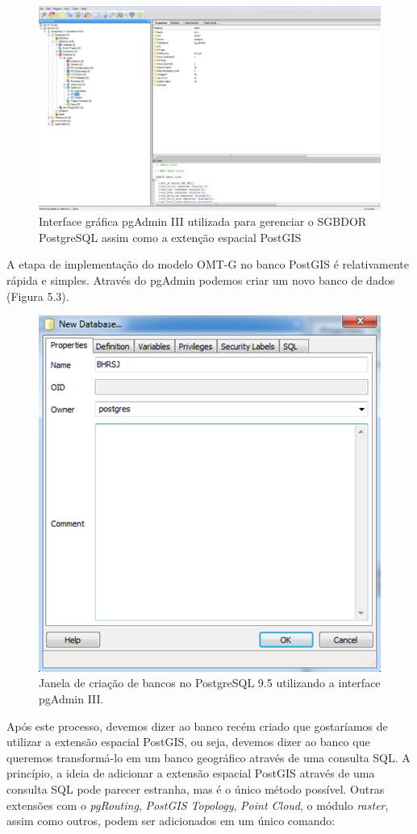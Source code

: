 	\begin{figure}
		\centering
		\includegraphics[width=1\linewidth]{data/pgAdmin-gui}
		\caption{Interface gráfica pgAdmin III utilizada para gerenciar o SGBDOR PostgreSQL assim como a extenção espacial PostGIS}
		\label{fig:pgadmin-gui}
	\end{figure}

A etapa de implementação do modelo OMT-G no banco PostGIS é relativamente rápida e simples. Através do pgAdmin podemos criar um novo banco de dados (Figura 5.3).

	\begin{figure}
		\centering
		\includegraphics[width=0.6\linewidth]{data/newdb_pgadmin}
		\caption{Janela de criação de bancos no PostgreSQL 9.5 utilizando a interface pgAdmin III.}
		\label{fig:newdbpgadmin}
	\end{figure}
	
Após este processo, devemos dizer ao banco recém criado que gostaríamos de utilizar a extensão espacial PostGIS, ou seja, devemos dizer ao banco que queremos transformá-lo em um banco geográfico através de uma consulta SQL. A princípio, a ideia de adicionar a extensão espacial PostGIS através de uma consulta SQL pode parecer estranha, mas é o único método possível. Outras extensões com o \textit{pgRouting}, \textit{PostGIS Topology}, \textit{Point Cloud}, o módulo \textit{raster}, assim como outros, podem ser adicionados em um único comando:

